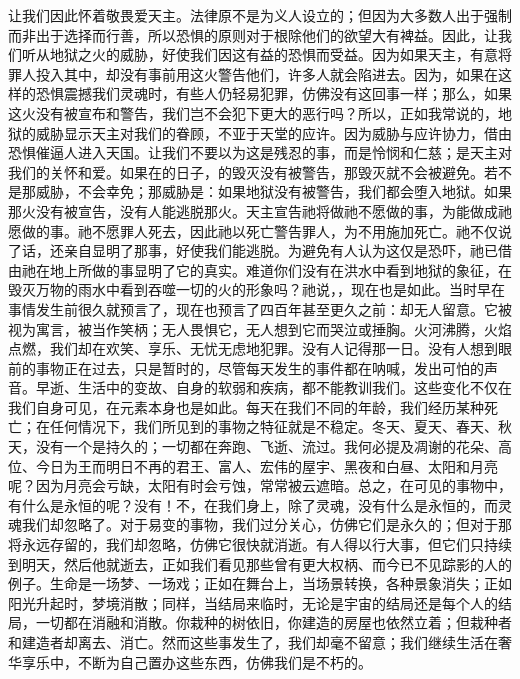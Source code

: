 让我们因此怀着敬畏爱天主。法律原不是为义人设立的；但因为大多数人出于强制而非出于选择而行善，所以恐惧的原则对于根除他们的欲望大有裨益。因此，让我们听从地狱之火的威胁，好使我们因这有益的恐惧而受益。因为如果天主，有意将罪人投入其中，却没有事前用这火警告他们，许多人就会陷进去。因为，如果在这样的恐惧震撼我们灵魂时，有些人仍轻易犯罪，仿佛没有这回事一样；那么，如果这火没有被宣布和警告，我们岂不会犯下更大的恶行吗？所以，正如我常说的，地狱的威胁显示天主对我们的眷顾，不亚于天堂的应许。因为威胁与应许协力，借由恐惧催逼人进入天国。让我们不要以为这是残忍的事，而是怜悯和仁慈；是天主对我们的关怀和爱。如果在的日子，的毁灭没有被警告，那毁灭就不会被避免。若不是那威胁，不会幸免；那威胁是：如果地狱没有被警告，我们都会堕入地狱。如果那火没有被宣告，没有人能逃脱那火。天主宣告祂将做祂不愿做的事，为能做成祂愿做的事。祂不愿罪人死去，因此祂以死亡警告罪人，为不用施加死亡。祂不仅说了话，还亲自显明了那事，好使我们能逃脱。为避免有人认为这仅是恐吓，祂已借由祂在地上所做的事显明了它的真实。难道你们没有在洪水中看到地狱的象征，在毁灭万物的雨水中看到吞噬一切的火的形象吗？祂说，，现在也是如此。当时早在事情发生前很久就预言了，现在也预言了四百年甚至更久之前：却无人留意。它被视为寓言，被当作笑柄；无人畏惧它，无人想到它而哭泣或捶胸。火河沸腾，火焰点燃，我们却在欢笑、享乐、无忧无虑地犯罪。没有人记得那一日。没有人想到眼前的事物正在过去，只是暂时的，尽管每天发生的事件都在呐喊，发出可怕的声音。早逝、生活中的变故、自身的软弱和疾病，都不能教训我们。这些变化不仅在我们自身可见，在元素本身也是如此。每天在我们不同的年龄，我们经历某种死亡；在任何情况下，我们所见到的事物之特征就是不稳定。冬天、夏天、春天、秋天，没有一个是持久的；一切都在奔跑、飞逝、流过。我何必提及凋谢的花朵、高位、今日为王而明日不再的君王、富人、宏伟的屋宇、黑夜和白昼、太阳和月亮呢？因为月亮会亏缺，太阳有时会亏蚀，常常被云遮暗。总之，在可见的事物中，有什么是永恒的呢？没有！不，在我们身上，除了灵魂，没有什么是永恒的，而灵魂我们却忽略了。对于易变的事物，我们过分关心，仿佛它们是永久的；但对于那将永远存留的，我们却忽略，仿佛它很快就消逝。有人得以行大事，但它们只持续到明天，然后他就逝去，正如我们看见那些曾有更大权柄、而今已不见踪影的人的例子。生命是一场梦、一场戏；正如在舞台上，当场景转换，各种景象消失；正如阳光升起时，梦境消散；同样，当结局来临时，无论是宇宙的结局还是每个人的结局，一切都在消融和消散。你栽种的树依旧，你建造的房屋也依然立着；但栽种者和建造者却离去、消亡。然而这些事发生了，我们却毫不留意；我们继续生活在奢华享乐中，不断为自己置办这些东西，仿佛我们是不朽的。\par


